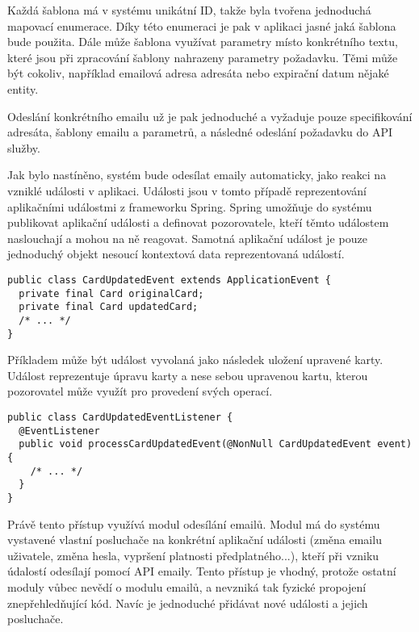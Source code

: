 		Každá šablona má v systému unikátní ID, takže byla tvořena jednoduchá mapovací enumerace.
		Díky této enumeraci je pak v aplikaci jasné jaká šablona bude použita.
		Dále může šablona využívat parametry místo konkrétního textu, které jsou při zpracování šablony nahrazeny
		parametry požadavku.
		Těmi může být cokoliv, například emailová adresa adresáta nebo expirační datum nějaké entity.

		Odeslání konkrétního emailu už je pak jednoduché a vyžaduje pouze specifikování adresáta,
		šablony emailu a parametrů, a následné odeslání požadavku do \ac{API} služby.

		Jak bylo nastíněno, systém bude odesílat emaily automaticky, jako reakci na vzniklé události v aplikaci.
		Události jsou v tomto případě reprezentování aplikačními událostmi z frameworku Spring.
		Spring umožňuje do systému publikovat aplikační události a definovat pozorovatele, kteří těmto událostem
		naslouchají a mohou na ně reagovat.
		Samotná aplikační událost je pouze jednoduchý objekt nesoucí kontextová data reprezentovaná událostí.

		\begin{codeblock}
			\begin{verbatim}
public class CardUpdatedEvent extends ApplicationEvent {
  private final Card originalCard;
  private final Card updatedCard;
  /* ... */
}
			\end{verbatim}
		\end{codeblock}

		Příkladem může být událost vyvolaná jako následek uložení upravené karty.
		Událost reprezentuje úpravu karty a nese sebou upravenou kartu, kterou pozorovatel může
		využít pro provedení svých operací.

		\begin{codeblock}
			\begin{verbatim}
public class CardUpdatedEventListener {
  @EventListener
  public void processCardUpdatedEvent(@NonNull CardUpdatedEvent event) {
    /* ... */
  }
}
			\end{verbatim}
			\captionsource{Ukázka pozorovatele aplikačních událostí.}{[autor]}
		\end{codeblock}

		Právě tento přístup využívá modul odesílání emailů.
		Modul má do systému vystavené vlastní posluchače na konkrétní aplikační události (změna emailu uživatele, změna hesla,
		vypršení platnosti předplatného...), kteří při vzniku údalostí odesílají pomocí \ac{API} emaily.
		Tento přístup je vhodný, protože ostatní moduly vůbec nevědí o modulu emailů, a nevzniká
		tak fyzické propojení znepřehledňující kód.
		Navíc je jednoduché přidávat nové události a jejich posluchače.

